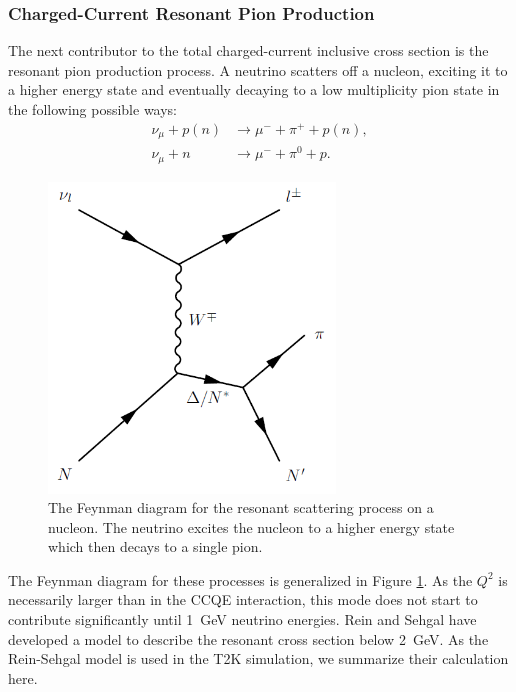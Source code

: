 \subsubsection{Charged-Current Resonant Pion Production}
\label{sec:resxsec}

The next contributor to the total charged-current inclusive cross section is the resonant pion production process. A neutrino scatters off a nucleon, exciting it to a higher energy state and eventually decaying to a low multiplicity pion state in the following possible ways:
\begin{align}
\nu_\mu + p(n) &\rightarrow \mu^{-}+\pi^++p(n),\\
\nu_\mu + n &\rightarrow \mu^{-}+\pi^0+p.
\end{align}

\begin{figure}
\centering
\includegraphics[width=3in]{Figures/1pi.png}
\caption{The Feynman diagram for the resonant scattering process on a nucleon. The neutrino excites the nucleon to a higher energy state which then decays to a single pion.} 
\label{fig:1pi}
\end{figure}
The Feynman diagram for these processes is generalized in Figure \ref{fig:1pi}. As the $Q^2$ is necessarily larger than in the CCQE interaction, this mode does not start to contribute significantly until 1~GeV neutrino energies. Rein and Sehgal \cite{RS1pi} have developed a model to describe the resonant cross section below 2~GeV. As the Rein-Sehgal model is used in the T2K simulation, we summarize their calculation here.

